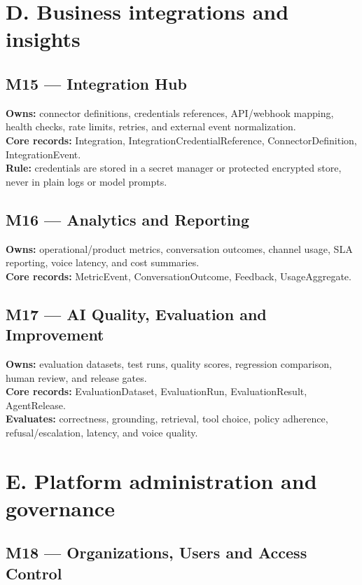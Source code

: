 \section{D. Business integrations and insights}

\subsection{M15 --- Integration Hub}

\textbf{Owns:} connector definitions, credentials references, API/webhook mapping, health checks, rate limits, retries, and external event normalization. \\ \textbf{Core records:} Integration, IntegrationCredentialReference, ConnectorDefinition, IntegrationEvent. \\ \textbf{Rule:} credentials are stored in a secret manager or protected encrypted store, never in plain logs or model prompts.

\subsection{M16 --- Analytics and Reporting}

\textbf{Owns:} operational/product metrics, conversation outcomes, channel usage, SLA reporting, voice latency, and cost summaries. \\ \textbf{Core records:} MetricEvent, ConversationOutcome, Feedback, UsageAggregate.

\subsection{M17 --- AI Quality, Evaluation and Improvement}

\textbf{Owns:} evaluation datasets, test runs, quality scores, regression comparison, human review, and release gates. \\ \textbf{Core records:} EvaluationDataset, EvaluationRun, EvaluationResult, AgentRelease. \\ \textbf{Evaluates:} correctness, grounding, retrieval, tool choice, policy adherence, refusal/escalation, latency, and voice quality.

\section{E. Platform administration and governance}

\subsection{M18 --- Organizations, Users and Access Control}

